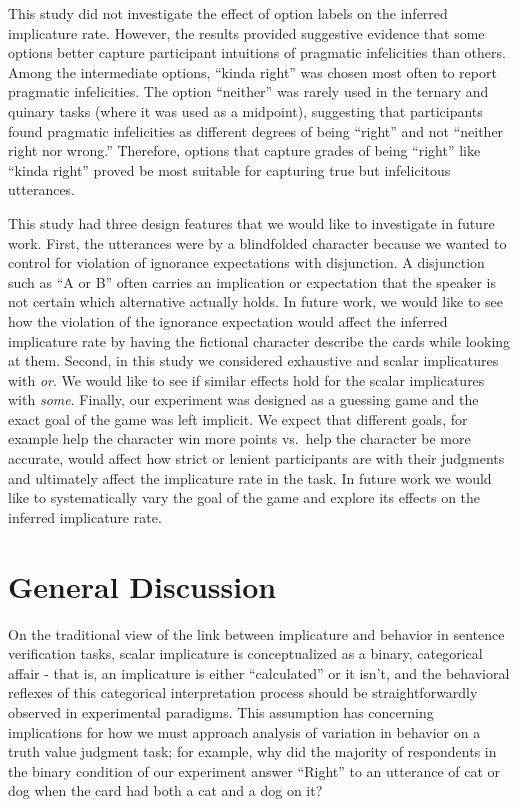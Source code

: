 \documentclass[floatsintext,man]{apa6}
\theoremstyle{definition}
\theoremstyle{definition}
\theoremstyle{definition}
\theoremstyle{remark}
\begin{document}
This study did not investigate the effect of option labels on the
inferred implicature rate. However, the results provided suggestive
evidence that some options better capture participant intuitions of
pragmatic infelicities than others. Among the intermediate options,
\enquote{kinda right} was chosen most often to report pragmatic
infelicities. The option \enquote{neither} was rarely used in the
ternary and quinary tasks (where it was used as a midpoint), suggesting
that participants found pragmatic infelicities as different degrees of
being \enquote{right} and not \enquote{neither right nor wrong.}
Therefore, options that capture grades of being \enquote{right} like
\enquote{kinda right} proved be most suitable for capturing true but
infelicitous utterances.

This study had three design features that we would like to investigate
in future work. First, the utterances were by a blindfolded character
because we wanted to control for violation of ignorance expectations
with disjunction. A disjunction such as \enquote{A or B} often carries
an implication or expectation that the speaker is not certain which
alternative actually holds. In future work, we would like to see how the
violation of the ignorance expectation would affect the inferred
implicature rate by having the fictional character describe the cards
while looking at them. Second, in this study we considered exhaustive
and scalar implicatures with \emph{or}. We would like to see if similar
effects hold for the scalar implicatures with \emph{some}. Finally, our
experiment was designed as a guessing game and the exact goal of the
game was left implicit. We expect that different goals, for example help
the character win more points vs.~help the character be more accurate,
would affect how strict or lenient participants are with their judgments
and ultimately affect the implicature rate in the task. In future work
we would like to systematically vary the goal of the game and explore
its effects on the inferred implicature rate.

\section{General Discussion}\label{general-discussion}

On the traditional view of the link between implicature and behavior in
sentence verification tasks, scalar implicature is conceptualized as a
binary, categorical affair - that is, an implicature is either
\enquote{calculated} or it isn't, and the behavioral reflexes of this
categorical interpretation process should be straightforwardly observed
in experimental paradigms. This assumption has concerning implications
for how we must approach analysis of variation in behavior on a truth
value judgment task; for example, why did the majority of respondents in
the binary condition of our experiment answer \enquote{Right} to an
utterance of cat or dog when the card had both a cat and a dog on it?
\end{document}
